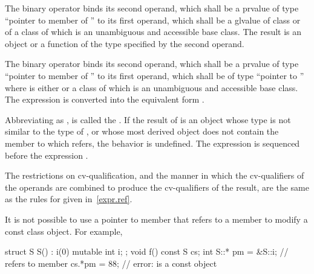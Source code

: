 \pnum
The binary operator  binds its second operand, which shall be
a prvalue
of type ``pointer to member of '' to its first operand, which shall be
a glvalue
of
class  or of a class of which  is an unambiguous and
accessible base class. The result is an object or a function of the type
specified by the second operand.

\pnum
The binary operator \tcode{->*} binds its second operand, which shall be
a prvalue
of type ``pointer to member of '' to its first operand, which shall be of
type ``pointer to ''
where  is either  or
a class of which 
is an unambiguous and accessible base class.
The expression  is converted into the equivalent form
.

\pnum
Abbreviating  as , 
is called the .
If the result of  is an object
whose type is not similar to the type of , or
whose most derived object does not
contain the member to which
 refers, the behavior is undefined.
The expression  is sequenced before the expression .

\pnum
The restrictions on cv-qualification, and the manner in which
the cv-qualifiers of the operands are combined to produce the
cv-qualifiers of the result, are the same as the rules for
 given in~\ref{expr.ref}.
\begin{note}
It is not possible to use a pointer to member that refers to a
 member to modify a const class object. For
example,
\begin{codeblock}
struct S {
  S() : i(0) { }
  mutable int i;
};
void f()
{
  const S cs;
  int S::* pm = &S::i;          //  refers to  member 
  cs.*pm = 88;                  // error:  is a const object
}
\end{codeblock}
\end{note}

